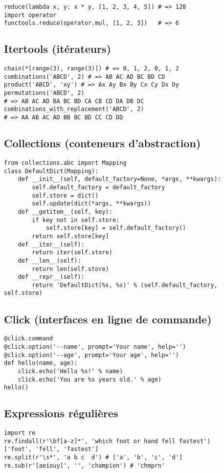 \documentclass[9pt]{extarticle}
\begin{document}
\begin{multicols*}{4}
\begin{lstlisting}
reduce(lambda x, y: x * y, [1, 2, 3, 4, 5]) # => 120
import operator
functools.reduce(operator.mul, [1, 2, 3])   # => 6
\end{lstlisting}

\subsection*{Itertools (itérateurs)}
\begin{lstlisting}
chain(*[range(3), range(3)]) # => 0, 1, 2, 0, 1, 2
combinations('ABCD', 2) # => AB AC AD BC BD CD
product('ABCD', 'xy') # => Ax Ay Bx By Cx Cy Dx Dy
permutations('ABCD', 2)
# => AB AC AD BA BC BD CA CB CD DA DB DC
combinations_with_replacement('ABCD', 2)
# => AA AB AC AD BB BC BD CC CD DD
\end{lstlisting}

\subsection*{Collections (conteneurs d'abstraction)}
\begin{lstlisting}
from collections.abc import Mapping
class DefaultDict(Mapping):
    def __init__(self, default_factory=None, *args, **kwargs):
        self.default_factory = default_factory
        self.store = dict()
        self.update(dict(*args, **kwargs))
    def __getitem__(self, key):
        if key not in self.store:
            self.store[key] = self.default_factory()
        return self.store[key]
    def __iter__(self):
        return iter(self.store)
    def __len__(self):
        return len(self.store)
    def __repr__(self):
        return 'DefaultDict(%s, %s)' % (self.default_factory, self.store)
\end{lstlisting}

\subsection*{Click (interfaces en ligne de commande)}
\begin{lstlisting}
@click.command
@click.option('--name', prompt='Your name', help='')
@click.option('--age', prompt='Your age', help='')
def hello(name, age):
    click.echo('Hello %s!' % name)
    click.echo('You are %s years old.' % age)
hello()
\end{lstlisting}

\subsection*{Expressions régulières}
\begin{lstlisting}
import re
re.findall(r'\bf[a-z]*', 'which foot or hand fell fastest')
['foot', 'fell', 'fastest']
re.split(r'\s*', 'a b c  d') # ['a', 'b', 'c', 'd']
re.sub(r'[aeiouy]', '', 'champion') # 'chmprn'
\end{lstlisting}


\end{multicols*}
\end{document}

